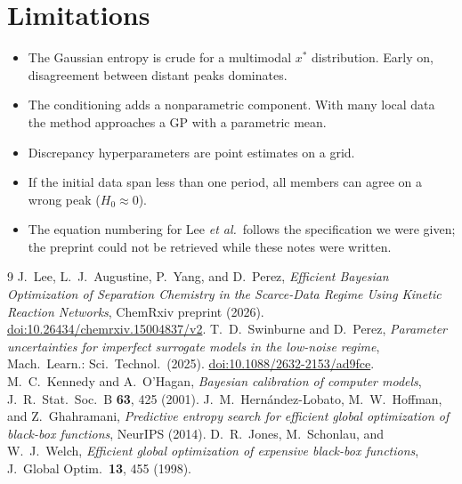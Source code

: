 \documentclass[11pt,a4paper]{article}
\begin{document}
\section{Limitations}
\begin{itemize}[itemsep=1pt]
\item The Gaussian entropy is crude for a multimodal $x^*$ distribution. Early on, disagreement between distant peaks dominates.
\item The conditioning adds a nonparametric component. With many local data the method approaches a GP with a parametric mean.
\item Discrepancy hyperparameters are point estimates on a grid.
\item If the initial data span less than one period, all members can agree on a wrong peak ($H_0\approx 0$).
\item The equation numbering for Lee \emph{et al.}\ follows the specification we were given; the preprint could not be retrieved while
these notes were written.
\end{itemize}

\begin{thebibliography}{9}
 J.~Lee, L.~J.~Augustine, P.~Yang, and D.~Perez,
\emph{Efficient Bayesian Optimization of Separation Chemistry in the Scarce-Data Regime Using Kinetic Reaction Networks},
ChemRxiv preprint (2026). \href{https://doi.org/10.26434/chemrxiv.15004837/v2}{doi:10.26434/chemrxiv.15004837/v2}.
 T.~D.~Swinburne and D.~Perez,
\emph{Parameter uncertainties for imperfect surrogate models in the low-noise regime},
Mach.\ Learn.: Sci.\ Technol.\ (2025). \href{https://doi.org/10.1088/2632-2153/ad9fce}{doi:10.1088/2632-2153/ad9fce}.
 M.~C.~Kennedy and A.~O'Hagan, \emph{Bayesian calibration of computer models}, J.\ R.\ Stat.\ Soc.\ B \textbf{63}, 425 (2001).
 J.~M.~Hern\'andez-Lobato, M.~W.~Hoffman, and Z.~Ghahramani, \emph{Predictive entropy search for efficient global optimization of black-box functions}, NeurIPS (2014).
 D.~R.~Jones, M.~Schonlau, and W.~J.~Welch, \emph{Efficient global optimization of expensive black-box functions}, J.\ Global Optim.\ \textbf{13}, 455 (1998).
\end{thebibliography}
\end{document}
